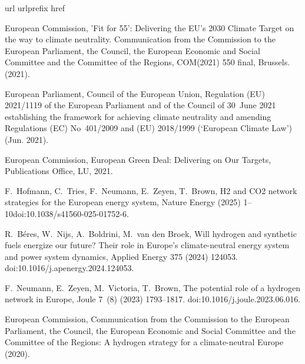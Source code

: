\documentclass[preprint,12pt,sort&compress]{elsarticle}
\begin{document}
\begin{thebibliography}{10}
\expandafter\ifx\csname url\endcsname\relax
  \def\url#1{\texttt{#1}}\fi
\expandafter\ifx\csname urlprefix\endcsname\relax\def\urlprefix{URL }\fi
\expandafter\ifx\csname href\endcsname\relax
  \def\href#1#2{#2} \def\path#1{#1}\fi

{European Commission}, '{{Fit}} for 55': Delivering the {{EU}}'s 2030 {{Climate Target}} on the way to climate neutrality. {{Communication}} from the {{Commission}} to the {{European Parliament}}, the {{Council}}, the {{European Economic}} and {{Social Committee}} and the {{Committee}} of the {{Regions}}, {{COM}}(2021) 550 final, {{Brussels}}. (2021).

{European Parliament}, {Council of the European Union}, Regulation ({{EU}}) 2021/1119 of the {{European Parliament}} and of the {{Council}} of 30~{{June}} 2021 establishing the framework for achieving climate neutrality and amending {{Regulations}} ({{EC}}) {{No}}~401/2009 and ({{EU}}) 2018/1999 (`{{European Climate Law}}') (Jun. 2021).

{European Commission}, European {{Green Deal}}: {{Delivering}} on Our Targets, Publications Office, LU, 2021.

F.~Hofmann, C.~Tries, F.~Neumann, E.~Zeyen, T.~Brown, H2 and {{CO2}} network strategies for the {{European}} energy system, Nature Energy (2025) 1--10\href {https://doi.org/10.1038/s41560-025-01752-6} {\path{doi:10.1038/s41560-025-01752-6}}.

R.~B{\'e}res, W.~Nijs, A.~Boldrini, M.~{van den Broek}, Will hydrogen and synthetic fuels energize our future? {{Their}} role in {{Europe}}'s climate-neutral energy system and power system dynamics, Applied Energy 375 (2024) 124053.
\newblock \href {https://doi.org/10.1016/j.apenergy.2024.124053} {\path{doi:10.1016/j.apenergy.2024.124053}}.

F.~Neumann, E.~Zeyen, M.~Victoria, T.~Brown, The potential role of a hydrogen network in {{Europe}}, Joule 7~(8) (2023) 1793--1817.
\newblock \href {https://doi.org/10.1016/j.joule.2023.06.016} {\path{doi:10.1016/j.joule.2023.06.016}}.

{European Commission}, Communication from the {{Commission}} to the {{European Parliament}}, the {{Council}}, the {{European Economic}} and {{Social Committee}} and the {{Committee}} of the {{Regions}}: {{A}} hydrogen strategy for a climate-neutral {{Europe}} (2020).


\end{thebibliography}
\end{document}

